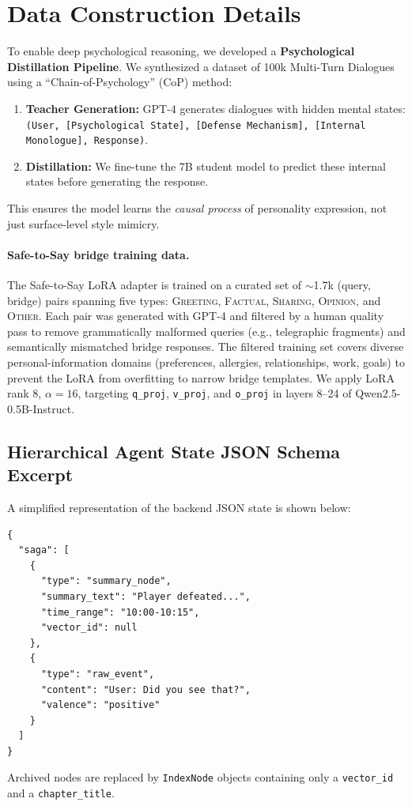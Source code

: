 \documentclass[11pt]{article}
\begin{document}
\section{Data Construction Details}
\label{app:data-details}
To enable deep psychological reasoning, we developed a \textbf{Psychological Distillation Pipeline}. We synthesized a dataset of 100k Multi-Turn Dialogues using a ``Chain-of-Psychology'' (CoP) method:
\begin{enumerate}
    \item \textbf{Teacher Generation:} GPT-4 generates dialogues with hidden mental states: \texttt{(User, [Psychological State], [Defense Mechanism], [Internal Monologue], Response)}.
    \item \textbf{Distillation:} We fine-tune the 7B student model to predict these internal states before generating the response.
\end{enumerate}
This ensures the model learns the \textit{causal process} of personality expression, not just surface-level style mimicry.

\paragraph{Safe-to-Say bridge training data.}
The Safe-to-Say LoRA adapter is trained on a curated set of $\sim$1.7k (query, bridge) pairs spanning five types: \textsc{Greeting}, \textsc{Factual}, \textsc{Sharing}, \textsc{Opinion}, and \textsc{Other}.
Each pair was generated with GPT-4 and filtered by a human quality pass to remove grammatically malformed queries (e.g., telegraphic fragments) and semantically mismatched bridge responses.
The filtered training set covers diverse personal-information domains (preferences, allergies, relationships, work, goals) to prevent the LoRA from overfitting to narrow bridge templates.
We apply LoRA rank 8, $\alpha{=}16$, targeting \texttt{q\_proj}, \texttt{v\_proj}, and \texttt{o\_proj} in layers 8--24 of Qwen2.5-0.5B-Instruct.


\subsection{Hierarchical Agent State JSON Schema Excerpt}
\label{app:json-schema}
A simplified representation of the backend JSON state is shown below:
\begin{Verbatim}[fontsize=\footnotesize]
{
  "saga": [
    {
      "type": "summary_node",
      "summary_text": "Player defeated...",
      "time_range": "10:00-10:15",
      "vector_id": null
    },
    {
      "type": "raw_event",
      "content": "User: Did you see that?",
      "valence": "positive"
    }
  ]
}
\end{Verbatim}
Archived nodes are replaced by \texttt{IndexNode} objects containing only a \texttt{vector\_id} and a \texttt{chapter\_title}.
\end{document}
